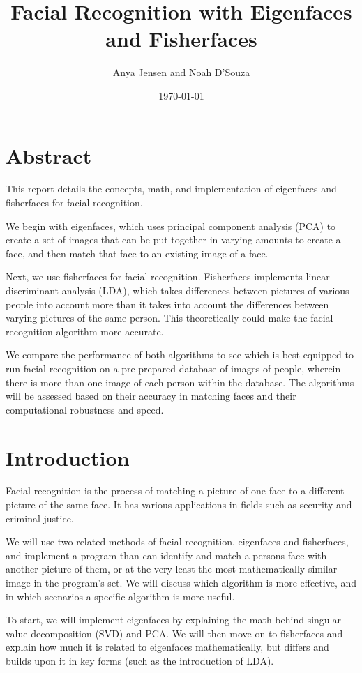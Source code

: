 \documentclass{tufte-handout}
\title{Facial Recognition with Eigenfaces and Fisherfaces}
\author{Anya Jensen and Noah D'Souza}
\date{\today}
\begin{document}
\maketitle

\vspace{0.1in}

\section{Abstract}
This report details the concepts, math, and implementation of eigenfaces and fisherfaces for facial recognition.

We begin with eigenfaces, which uses principal component analysis (PCA) to create a set of images that can be put together in varying amounts to create a face, and then match that face to an existing image of a face.

Next, we use fisherfaces for facial recognition. Fisherfaces implements linear discriminant analysis (LDA), which takes differences between pictures of various people into account more than it takes into account the differences between varying pictures of the same person. This theoretically could make the facial recognition algorithm more accurate.

We compare the performance of both algorithms to see which is best equipped to run facial recognition on a pre-prepared database of images of people, wherein there is more than one image of each person within the database. The algorithms will be assessed based on their accuracy in matching faces and their computational robustness and speed.

\section{Introduction}
Facial recognition is the process of matching a picture of one face to a different picture of the same face. It has various applications in fields such as security and criminal justice.

We will use two related methods of facial recognition, eigenfaces and fisherfaces, and implement a program than can identify and match a person\textsc{}s face with another picture of them, or at the very least the most mathematically similar image in the program’s set. We will discuss which algorithm is more effective, and in which scenarios a specific algorithm is more useful.

To start, we will implement eigenfaces by explaining the math behind singular value decomposition (SVD) and PCA. We will then move on to fisherfaces and explain how much it is related to eigenfaces mathematically, but differs and builds upon it in key forms (such as the introduction of LDA).
\end{document}

